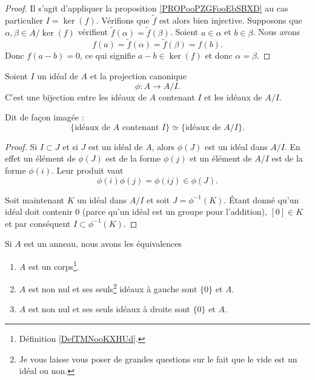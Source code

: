 \begin{proof}
	Il s'agit d'appliquer la proposition \ref{PROPooPZGFooEbSBXD} au cas particulier \( I=\ker(f)\). Vérifions que \( \tilde f\) est alors bien injective. Supposons que \( \alpha,\beta\in A/\ker(f)\) vérifient \( \tilde f(\alpha)=\tilde f(\beta)\). Soient \( a\in \alpha\) et \( b\in \beta\). Nous avons
	\begin{equation}
		f(a)=\tilde f(\alpha)=\tilde f(\beta)=f(b).
	\end{equation}
	Donc \( f(a-b)=0\), ce qui signifie \( a-b\in\ker(f)\) et donc \( \alpha=\beta\).
\end{proof}

\begin{proposition}     \label{PropIJJIdsousphi}
	Soient \( I\) un idéal de \( A\) et la projection canonique
	\begin{equation}
		\phi\colon A\to A/I.
	\end{equation}
	C'est une bijection entre les idéaux de \( A\) contenant \( I\) et les idéaux de \( A/I\).

	Dit de façon imagée :
	\begin{equation}        \label{EqKbrizu}
		\{ \text{idéaux de } A\text{ contenant } I\}\simeq\{ \text{idéaux de } A/I \}.
	\end{equation}
\end{proposition}

\begin{proof}
	Si \( I\subset J\) et si \( J \) est un idéal de \( A\), alors \( \phi(J)\) est un idéal dans \( A/I\). En effet un élément de \( \phi(J)\) est de la forme \( \phi(j)\) et un élément de \( A/I\) est de la forme \( \phi(i)\). Leur produit vaut
	\begin{equation}
		\phi(i)\phi(j)=\phi(ij)\in\phi(J).
	\end{equation}

	Soit maintenant \( K\) un idéal dans \( A/I\) et soit \( J=\phi^{-1}(K)\). Étant donné qu'un idéal doit contenir \( 0\) (parce qu'un idéal est un groupe pour l'addition), \( [0]\in K\) et par conséquent \( I\subset\phi^{-1}(K)\).
\end{proof}

\begin{proposition}     \label{AnnCorpsIdeal}\label{PROPooUOCVooZGAVVk}
	Si \( A\) est un anneau, nous avons les équivalences
	\begin{enumerate}
		\item       \label{ITEMooLAAVooXhTcMe}
		      \( A\) est un corps\footnote{Définition \ref{DefTMNooKXHUd}.}.
		\item       \label{ITEMooDGZIooRopYGx}
		      \( A\) est non nul et ses seuls\footnote{Je vous laisse vous poser de grandes questions sur le fait que le vide est un idéal ou non.} idéaux à gauche sont \( \{ 0 \}\) et \( A\).
		\item       \label{ITEMooLPWHooDJpTbR}
		      \( A\) est non nul et ses seuls idéaux à droite sont \( \{ 0 \}\) et \( A\).
	\end{enumerate}
\end{proposition}

